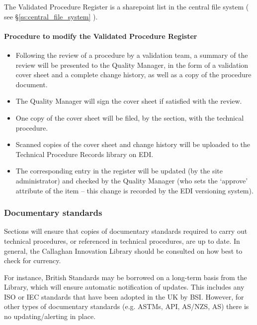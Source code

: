 The Validated Procedure Register is a sharepoint list in the central file system ( see \S\ref{ss:central_file_system} ). 

\paragraph{Procedure to modify the Validated Procedure Register}
\begin{itemize}
\item Following the review of a procedure by a validation team, a summary of the review will be presented to the Quality Manager, in the form of a validation cover sheet and a complete change history, as well as a copy of the procedure document.
\item The Quality Manager will sign the cover sheet if satisfied with the review.
\item One copy of the cover sheet will be filed, by the section, with the technical procedure. 
\item Scanned copies of the cover sheet and change history will be uploaded to the Technical Procedure Records library on EDI.
\item The corresponding entry in the register will be updated (by the site administrator) and checked by the Quality Manager (who sets the ‘approve’ attribute of the item – this change is recorded by the EDI versioning system).
\end{itemize} 

\subsubsection{Documentary standards}
Sections will ensure that copies of documentary standards required to carry out technical procedures, or referenced in technical procedures, are up to date. 
In general, the Callaghan Innovation Library should be consulted on how best to check for currency.

For instance, British Standards may be borrowed on a long-term basis from the Library, which will ensure automatic notification of updates. This includes any ISO or IEC standards that have been adopted in the UK by BSI. However, for other types of documentary standards (e.g. ASTMs, API, AS/NZS, AS) there is no updating/alerting in place. 